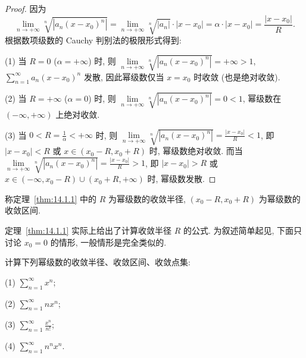 \begin{proof}
因为
\[
  \lim_{n\to+\infty}\sqrt[n]{|a_{n}(x-x_{0})^{n}|}=\lim_{n\to+\infty}\sqrt[n]{|a_{n}|}\cdot|x-x_{0}|=\alpha\cdot|x-x_{0}|=\frac{|x-x_{0}|}{R}.
\]
根据数项级数的 Cauchy 判别法的极限形式得到:

(1) 当 $R=0$ ($\alpha=+\infty$) 时, 则 $\lim\limits_{n\to+\infty}\sqrt[n]{|a_{n}(x-x_{0})^{n}|}=+\infty>1$, $\sum_{n=1}^{\infty}a_{n}(x-x_{0})^{n}$ 发散, 因此幂级数仅当 $x=x_{0}$ 时收敛 (也是绝对收敛).

(2) 当 $R=+\infty$ ($\alpha=0$) 时, 则 $\lim\limits_{n\to+\infty}\sqrt[n]{|a_{n}(x-x_{0})^{n}|}=0<1$, 幂级数在 $(-\infty,+\infty)$ 上绝对收敛.

(3) 当 $0<R=\frac{1}{\alpha}<+\infty$ 时, 则 $\lim\limits_{n\to+\infty}\sqrt[n]{|a_{n}(x-x_{0})^{n}|}=\frac{|x-x_{0}|}{R}<1$, 即 $|x-x_{0}|<R$ 或 $x\in(x_{0}-R,x_{0}+R)$ 时, 幂级数绝对收敛. 而当 $\lim\limits_{n\to+\infty}\sqrt[n]{|a_{n}(x-x_{0})^{n}|}=\frac{|x-x_{0}|}{R}>1$, 即 $|x-x_{0}|>R$ 或 $x\in(-\infty,x_{0}-R)\cup(x_{0}+R,+\infty)$ 时, 幂级数发散.
\end{proof}

\begin{definition}\label{def:14.1.1}
称定理~\ref{thm:14.1.1} 中的 $R$ 为幂级数的收敛半径, $(x_{0}-R,x_{0}+R)$ 为幂级数的收敛区间.
\end{definition}

定理~\ref{thm:14.1.1} 实际上给出了计算收敛半径 $R$ 的公式. 为叙述简单起见, 下面只讨论 $x_{0}=0$ 的情形, 一般情形是完全类似的.

\begin{example}\label{ex:14.1.1}
计算下列幂级数的收敛半径、收敛区间、收敛点集:

(1) $\sum_{n=1}^{\infty}x^{n}$;

(2) $\sum_{n=1}^{\infty}nx^{n}$;

(3) $\sum_{n=1}^{\infty}\frac{x^{n}}{n!}$;

(4) $\sum_{n=1}^{\infty}n^{n}x^{n}$.
\end{example}

